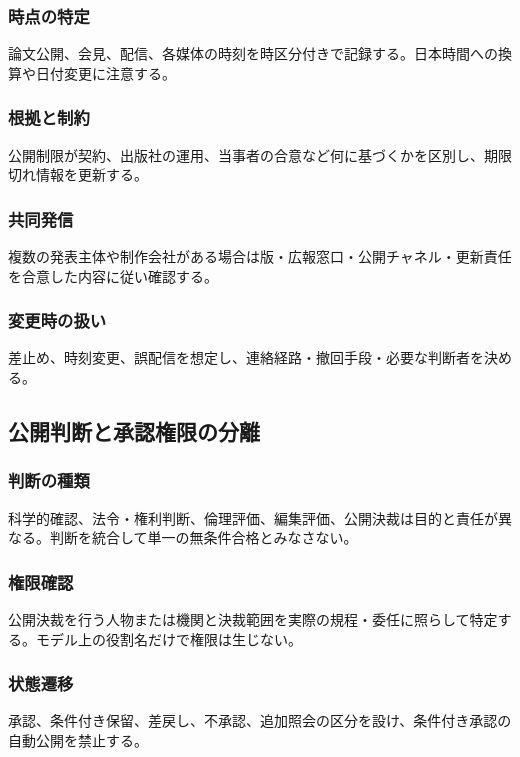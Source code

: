 \documentclass[a4paper,11pt]{article}
\begin{document}
\subsubsection{時点の特定}
\par 論文公開、会見、配信、各媒体の時刻を時区分付きで記録する。日本時間への換算や日付変更に注意する。\par\medskip
\subsubsection{根拠と制約}
\par 公開制限が契約、出版社の運用、当事者の合意など何に基づくかを区別し、期限切れ情報を更新する。\par\medskip
\subsubsection{共同発信}
\par 複数の発表主体や制作会社がある場合は版・広報窓口・公開チャネル・更新責任を合意した内容に従い確認する。\par\medskip
\subsubsection{変更時の扱い}
\par 差止め、時刻変更、誤配信を想定し、連絡経路・撤回手段・必要な判断者を決める。\par\medskip
\subsection{公開判断と承認権限の分離}
\subsubsection{判断の種類}
\par 科学的確認、法令・権利判断、倫理評価、編集評価、公開決裁は目的と責任が異なる。判断を統合して単一の無条件合格とみなさない。\par\medskip
\subsubsection{権限確認}
\par 公開決裁を行う人物または機関と決裁範囲を実際の規程・委任に照らして特定する。モデル上の役割名だけで権限は生じない。\par\medskip
\subsubsection{状態遷移}
\par 承認、条件付き保留、差戻し、不承認、追加照会の区分を設け、条件付き承認の自動公開を禁止する。\par\medskip
\end{document}
